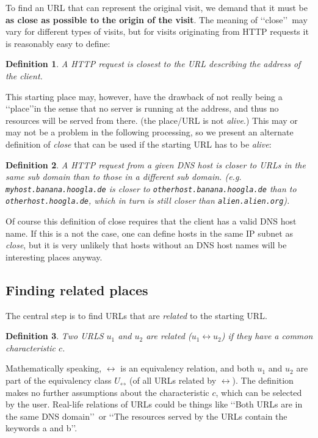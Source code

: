 \documentclass[a4paper]{danarticle}
\newtheorem*{definition}{Definition}
\begin{document}
       To find an URL that can represent the original visit, we demand
       that it must be \textbf{as close as possible to the origin of the visit}.
       The meaning of \lq\lq close\rq\rq\ may vary for
       different types of visits, but for visits originating from HTTP requests
       it is reasonably easy to define:
       \begin{definition}
       A HTTP request is closest to the URL describing the address of the
       client.
       \end{definition}
       This starting place may, however, have the drawback of not really 
       being a
       \lq\lq place\rq\rq in the sense that no server is running at the
       address, and thus no resources will be served from there. (the place/URL 
       is not \textit{alive}.) This may or may not be a problem in
       the following processing, so we present an alternate definition of
       \textit{close} that can be used if the starting URL has to be
       \textit{alive}:
       \begin{definition}
       A HTTP request from a given DNS host is closer to URLs in the same
       sub domain than to those in a different sub domain. (e.g. 
       \verb$myhost.banana.hoogla.de$ is closer to 
       \verb$otherhost.banana.hoogla.de$
       than to \verb$otherhost.hoogla.de$, which in turn is still closer than
       \verb$alien.alien.org$).
       \end{definition}
       Of course this definition of close requires that the client has a valid
       DNS host name. If this is a not the case, 
       one can define hosts in the same IP
       subnet as \textit{close}, but it is very unlikely that hosts without an
       DNS host names will be interesting places anyway.
     \subsection{Finding related places}
       The central step is to find URLs that are \textit{related} to the
       starting URL. 
       \begin{definition}
       Two URLS $ u_1 $ and $ u_2 $ are \textit{related} 
       ($ u_1 \leftrightarrow u_2 $) if they \textit{have a common
       characteristic} $ c $. 
       \end{definition}
       Mathematically speaking, $ \leftrightarrow $ is an equivalency relation,
       and both $ u_1 $ and $ u_2 $ are part of the equivalency class 
       $ U_{\leftrightarrow} $
       (of all URLs related by $ \leftrightarrow $). The definition makes no
       further assumptions about the characteristic $ c $, which can be selected
       by the user. Real-life relations of URLs could be things like 
       \lq\lq Both URLs are in the same DNS domain\rq\rq\ or \lq\lq The
       resources served by the URLs contain the keywords a and b\rq\rq . 
       
\end{document}
